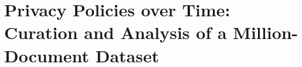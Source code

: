 \chapter{Privacy Policies over Time: Curation and Analysis of a Million-Document Dataset}  \label{ch:ppot}









